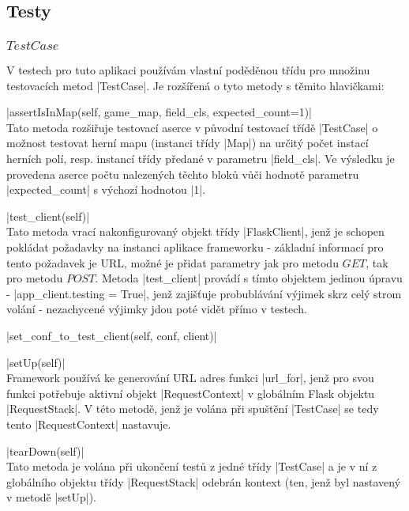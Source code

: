 \subsection{Testy}

\subsubsection{$TestCase$}

V testech pro tuto aplikaci používám vlastní poděděnou třídu pro množinu testovacích metod \ic|TestCase|. Je rozšířená o tyto metody s těmito hlavičkami:
\begin{description}
	\item \ic|assertIsInMap(self, game_map, field_cls, expected_count=1)| \\
	Tato metoda rozšiřuje testovací aserce v původní testovací třídě \ic|TestCase| o možnost testovat herní mapu (instanci třídy \ic|Map|) na určitý počet instací herních polí, resp. instancí třídy předané v parametru \ic|field_cls|. Ve výsledku je provedena aserce počtu nalezených těchto bloků vůči hodnotě parametru \ic|expected_count| s výchozí hodnotou \ic|1|.
	
    \item \ic|test_client(self)| \\
    Tato metoda vrací nakonfigurovaný objekt třídy \ic|FlaskClient|, jenž je schopen pokládat požadavky na instanci aplikace frameworku  - základní informací pro tento požadavek je URL, možné je přidat parametry jak pro  metodu $GET$, tak pro metodu $POST$. Metoda \ic|test_client| provádí s tímto objektem jedinou úpravu - \ic|app_client.testing = True|, jenž zajišťuje probublávání výjimek skrz celý strom volání - nezachycené výjimky jdou poté vidět přímo v testech.

    \item \ic|set_conf_to_test_client(self, conf, client)| \\

    \item \ic|setUp(self)| \\
    Framework  používá ke generování URL adres funkci \ic|url_for|, jenž pro svou funkci potřebuje aktivní objekt \ic|RequestContext| v globálním Flask objektu  \ic|RequestStack|. V této metodě, jenž je volána při spuštění \ic|TestCase| se tedy tento \ic|RequestContext| nastavuje. 

    \item \ic|tearDown(self)| \\
    Tato metoda je volána při ukončení testů z jedné třídy \ic|TestCase| a je v ní z globálního objektu třídy \ic|RequestStack| odebrán kontext (ten, jenž byl nastavený v metodě \ic|setUp|).
\end{description}
